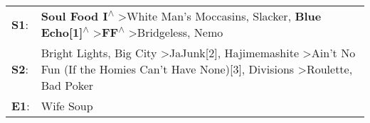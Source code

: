 \begin{supertabular}{p{0.03\textwidth}p{0.92\textwidth}}
 \textbf{S1}:  &  \textbf{Soul Food I\textsuperscript{$\wedge$}} \textgreater \enspace White Man's Moccasins\textsuperscript{}, \enspace Slacker\textsuperscript{}, \enspace \textbf{Blue Echo[1]\textsuperscript{$\wedge$}} \textgreater \enspace \textbf{FF\textsuperscript{$\wedge$}} \textgreater \enspace Bridgeless\textsuperscript{}, \enspace Nemo\textsuperscript{}  \enspace  \\
 \textbf{S2}:  &  Bright Lights, Big City\textsuperscript{} \textgreater \enspace JaJunk[2]\textsuperscript{}, \enspace Hajimemashite\textsuperscript{} \textgreater \enspace Ain't No Fun (If the Homies Can't Have None)[3]\textsuperscript{}, \enspace Divisions\textsuperscript{} \textgreater \enspace Roulette\textsuperscript{}, \enspace Bad Poker\textsuperscript{}  \enspace  \\
 \textbf{E1}:  &                                                                                                                                                                                                                                                                                                                                 Wife Soup\textsuperscript{}  \enspace  \\
\end{supertabular}
